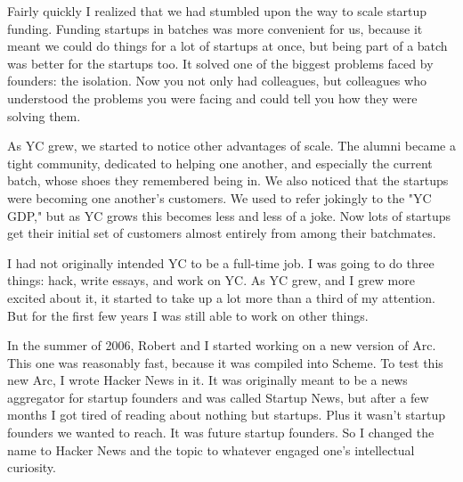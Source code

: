 Fairly quickly I realized that we had stumbled
                  upon the way to scale startup funding. Funding startups in
                  batches was more convenient for us, because it meant we could
                  do things for a lot of startups at once, but being part of a
                  batch was better for the startups too. It solved one of the
                  biggest problems faced by founders: the isolation. Now you not
                  only had colleagues, but colleagues who understood the
                  problems you were facing and could tell you how they were
                  solving them.

As YC grew, we started to notice
                  other advantages of scale. The alumni became a tight
                  community, dedicated to helping one another, and especially
                  the current batch, whose shoes they remembered being in. We
                  also noticed that the startups were becoming one another's
                  customers. We used to refer jokingly to the "YC GDP," but as
                  YC grows this becomes less and less of a joke. Now lots of
                  startups get their initial set of customers almost entirely
                  from among their batchmates.

I had not originally
                  intended YC to be a full-time job. I was going to do three
                  things: hack, write essays, and work on YC. As YC grew, and I
                  grew more excited about it, it started to take up a lot more
                  than a third of my attention. But for the first few years I
                  was still able to work on other things.

In the
                  summer of 2006, Robert and I started working on a new version
                  of Arc. This one was reasonably fast, because it was compiled
                  into Scheme. To test this new Arc, I wrote Hacker News in it.
                  It was originally meant to be a news aggregator for startup
                  founders and was called Startup News, but after a few months I
                  got tired of reading about nothing but startups. Plus it
                  wasn't startup founders we wanted to reach. It was future
                  startup founders. So I changed the name to Hacker News and the
                  topic to whatever engaged one's intellectual curiosity.

